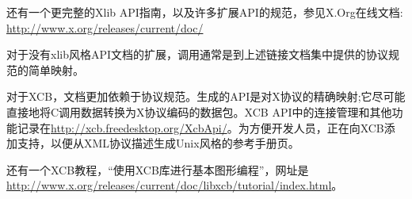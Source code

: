 还有一个更完整的Xlib API指南，以及许多扩展API的规范，参见X.Org在线文档: \href{http://www.x.org/releases/current/doc/}{http://www.x.org/releases/current/doc/}

对于没有xlib风格API文档的扩展，调用通常是到上述链接文档集中提供的协议规范的简单映射。

对于XCB，文档更加依赖于协议规范。生成的API是对X协议的精确映射;它尽可能直接地将C调用数据转换为X协议编码的数据包。XCB API中的连接管理和其他功能记录在\href{http://xcb.freedesktop.org/XcbApi/}{http://xcb.freedesktop.org/XcbApi/}。为方便开发人员，正在向XCB添加支持，以便从XML协议描述生成Unix风格的参考手册页。

还有一个XCB教程，“使用XCB库进行基本图形编程”，网址是\href{http://www.x.org/releases/current/doc/libxcb/tutorial/index.html}{http://www.x.org/releases/current/doc/libxcb/tutorial/index.html}。

